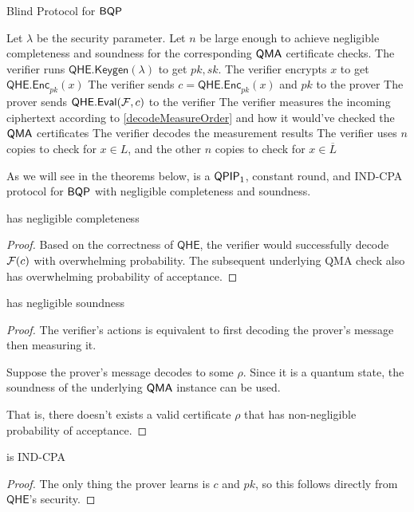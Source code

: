 \begin{algorithm}
	\caption{Blind Protocol for $\operatorname{\mathsf{BQP}}$}
	\label{proto:BlindBQP}
	\begin{algorithmic}[1]
		\State Let $\lambda$ be the security parameter.
		\State Let $n$ be large enough to achieve negligible completeness and soundness for the corresponding $\operatorname{\mathsf{QMA}}$ certificate checks.
		\State The verifier runs $\mathsf{QHE.Keygen}(\lambda)$ to get $pk, sk$.
		\State The verifier encrypts $x$ to get $\mathsf{QHE.Enc}_{pk}(x)$
		\State The verifier sends $c=\mathsf{QHE.Enc}_{pk}(x)$ and $pk$ to the prover
		\State The prover sends $\mathsf{QHE.Eval}(\mathcal{F}, c)$ to the verifier
		\State The verifier measures the incoming ciphertext according to \autoref{decodeMeasureOrder} and how it would've checked the $\operatorname{\mathsf{QMA}}$ certificates
		\State The verifier decodes the measurement results
		\State The verifier uses $n$ copies to check for $x\in L$, and the other $n$ copies to check for $x\in\overline{L}$
	\end{algorithmic}
\end{algorithm}

As we will see in the theorems below,  is a $\operatorname{\mathsf{QPIP}}_1$, constant round, and IND-CPA protocol for $\operatorname{\mathsf{BQP}}$ with negligible completeness and soundness.

\begin{thm}
	 has negligible completeness
\end{thm}
\begin{proof}
	Based on the correctness of $\mathsf{QHE}$, the verifier would successfully decode $\mathcal{F}(c)$ with overwhelming probability.
	The subsequent underlying QMA check also has overwhelming probability of acceptance.
\end{proof}

\begin{thm}
	 has negligible soundness
\end{thm}
\begin{proof}
	The verifier's actions is equivalent to first decoding the prover's message then measuring it.

	Suppose the prover's message decodes to some $\rho$. Since it is a quantum state, the soundness of the underlying $\operatorname{\mathsf{QMA}}$ instance can be used.
	
	That is, there doesn't exists a valid certificate $\rho$ that has non-negligible probability of acceptance.
\end{proof}

\begin{thm}
	 is IND-CPA
\end{thm}
\begin{proof}
	The only thing the prover learns is $c$ and $pk$, so this follows directly from $\mathsf{QHE}$'s security.
\end{proof}

